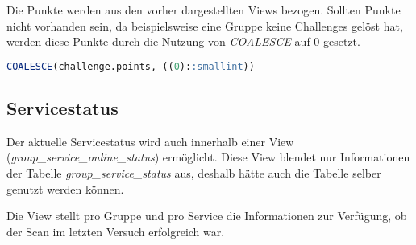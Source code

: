 Die Punkte werden aus den vorher dargestellten Views bezogen. Sollten Punkte nicht vorhanden sein, da beispielsweise eine Gruppe keine Challenges gelöst hat, werden diese Punkte durch die Nutzung von \textit{COALESCE} auf 0 gesetzt.

\begin{lstlisting}[frame=single, language=sql, caption={SQL Ersetzen nicht vorhandener Punkte}, captionpos=b, label={lst:database-total-points-0}]
COALESCE(challenge.points, ((0)::smallint)) 
\end{lstlisting}

\subsection{Servicestatus}
Der aktuelle Servicestatus wird auch innerhalb einer View (\textit{group\_service\_online\_status}) ermöglicht. Diese View blendet nur Informationen der Tabelle \textit{group\_service\_status} aus, deshalb hätte auch die Tabelle selber genutzt werden können.

Die View stellt pro Gruppe und pro Service die Informationen zur Verfügung, ob der Scan im letzten Versuch erfolgreich war.